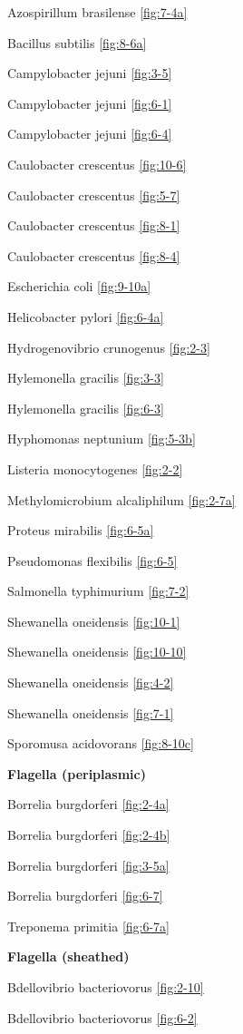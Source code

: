 \documentclass[]{tufte-book}
\begin{document}
Azospirillum brasilense \ref{fig:7-4a}

Bacillus subtilis \ref{fig:8-6a}

Campylobacter jejuni \ref{fig:3-5}

Campylobacter jejuni \ref{fig:6-1}

Campylobacter jejuni \ref{fig:6-4}

Caulobacter crescentus \ref{fig:10-6}

Caulobacter crescentus \ref{fig:5-7}

Caulobacter crescentus \ref{fig:8-1}

Caulobacter crescentus \ref{fig:8-4}

Escherichia coli \ref{fig:9-10a}

Helicobacter pylori \ref{fig:6-4a}

Hydrogenovibrio crunogenus \ref{fig:2-3}

Hylemonella gracilis \ref{fig:3-3}

Hylemonella gracilis \ref{fig:6-3}

Hyphomonas neptunium \ref{fig:5-3b}

Listeria monocytogenes \ref{fig:2-2}

Methylomicrobium alcaliphilum \ref{fig:2-7a}

Proteus mirabilis \ref{fig:6-5a}

Pseudomonas flexibilis \ref{fig:6-5}

Salmonella typhimurium \ref{fig:7-2}

Shewanella oneidensis \ref{fig:10-1}

Shewanella oneidensis \ref{fig:10-10}

Shewanella oneidensis \ref{fig:4-2}

Shewanella oneidensis \ref{fig:7-1}

Sporomusa acidovorans \ref{fig:8-10c}

\textbf{Flagella (periplasmic)}

Borrelia burgdorferi \ref{fig:2-4a}

Borrelia burgdorferi \ref{fig:2-4b}

Borrelia burgdorferi \ref{fig:3-5a}

Borrelia burgdorferi \ref{fig:6-7}

Treponema primitia \ref{fig:6-7a}

\textbf{Flagella (sheathed)}

Bdellovibrio bacteriovorus \ref{fig:2-10}

Bdellovibrio bacteriovorus \ref{fig:6-2}
\end{document}
